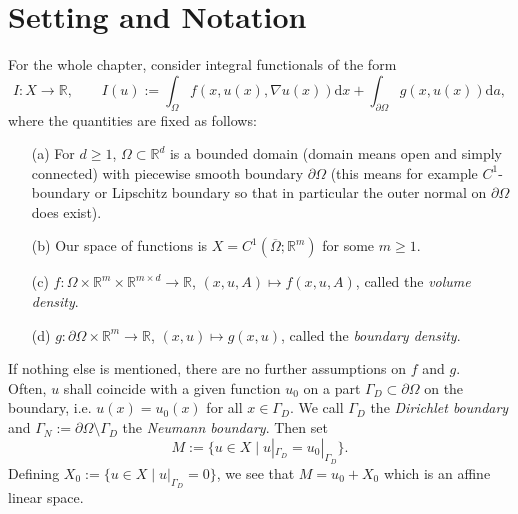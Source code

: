 \section{Setting and Notation}
For the whole chapter, consider integral functionals of the form
\[I:X\longrightarrow\mathbb{R},\qquad I(u):=\int_\Omega{f(x,u(x),\nabla u(x))\mathrm{d}x}+\int_{\partial\Omega}{g(x,u(x))\mathrm{d}a},\]
where the quantities are fixed as follows:
\begin{itemize}
	\item[(a)] For $d\geq1$, $\Omega\subset\mathbb{R}^d$ is a bounded domain (domain means open and simply connected) with piecewise smooth boundary $\partial\Omega$ (this means for example $C^1$-boundary or Lipschitz boundary so that in particular the outer normal on $\partial\Omega$ does exist).
	\item[(b)] Our space of functions is $X=C^1(\overline{\Omega};\mathbb{R}^m)$ for some $m\geq1$.
	\item[(c)] $f:\Omega\times\mathbb{R}^m\times\mathbb{R}^{m\times d}\longrightarrow\mathbb{R}$, $(x,u,A)\longmapsto f(x,u,A)$, called the \textit{volume density}.
	\item[(d)] $g:\partial\Omega\times\mathbb{R}^m\longrightarrow\mathbb{R}$, $(x,u)\longmapsto g(x,u)$, called the \textit{boundary density}.
\end{itemize}
If nothing else is mentioned, there are no further assumptions on $f$ and $g$.\\

Often, $u$ shall coincide with a given function $u_0$ on a part $\Gamma_D\subset\partial\Omega$ on the boundary, i.e. $u(x)=u_0(x)$ for all $x\in\Gamma_D$. We call $\Gamma_D$ the \textit{Dirichlet boundary} and $\Gamma_N:=\partial\Omega\setminus\Gamma_D$ the \textit{Neumann boundary}. Then set
\[M:=\{u\in X\mid u|_{\Gamma_D}=u_0|_{\Gamma_D}\}.\]
Defining $X_0:=\{u\in X\mid u|_{\Gamma_D}=0\}$, we see that $M=u_0+X_0$ which is an affine linear space.\\[11pt]

